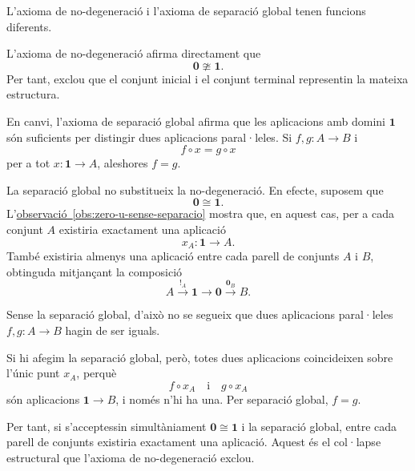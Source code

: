 \begin{observacio}
\label{obs:separacio-no-degeneracio}

L'axioma de no-degeneració i l'axioma de separació global tenen
funcions diferents.

L'axioma de no-degeneració afirma directament que
\[
\mathbf0\ncong\mathbf1.
\]
Per tant, exclou que el conjunt inicial i el conjunt terminal
representin la mateixa estructura.

En canvi, l'axioma de separació global afirma que les aplicacions
amb domini \(\mathbf1\) són suficients per distingir dues
aplicacions paral·leles. Si \(f,g:A\to B\) i
\[
f\circ x=g\circ x
\]
per a tot \(x:\mathbf1\to A\), aleshores \(f=g\).

La separació global no substitueix la no-degeneració. En efecte,
suposem que
\[
\mathbf0\cong\mathbf1.
\]
L'\hyperref[obs:zero-u-sense-separacio]
{observació~\ref*{obs:zero-u-sense-separacio}} mostra que, en
aquest cas, per a cada conjunt \(A\) existiria exactament una
aplicació
\[
x_A:\mathbf1\to A.
\]
També existiria almenys una aplicació entre cada parell de
conjunts \(A\) i \(B\), obtinguda mitjançant la composició
\[
A\xrightarrow{{!}_A}\mathbf1
 \longrightarrow\mathbf0
 \xrightarrow{\mathbf{0}_B}B.
\]

Sense la separació global, d'això no se segueix que dues
aplicacions paral·leles \(f,g:A\to B\) hagin de ser iguals.

Si hi afegim la separació global, però, totes dues aplicacions
coincideixen sobre l'únic punt \(x_A\), perquè
\[
f\circ x_A
\quad\text{i}\quad
g\circ x_A
\]
són aplicacions \(\mathbf1\to B\), i només n'hi ha una. Per
separació global, \(f=g\).

Per tant, si s'acceptessin simultàniament
\(\mathbf0\cong\mathbf1\) i la separació global, entre cada parell
de conjunts existiria exactament una aplicació. Aquest és el
col·lapse estructural que l'axioma de no-degeneració exclou.
\end{observacio}

